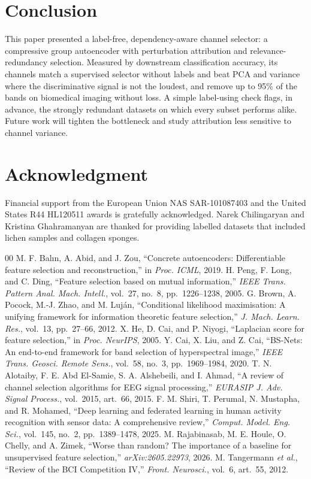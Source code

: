 \documentclass[conference]{IEEEtran}
\begin{document}
\section{Conclusion}
This paper presented a label-free, dependency-aware channel selector: a compressive
group autoencoder with perturbation attribution and relevance-redundancy selection.
Measured by downstream classification accuracy, its channels match a supervised
selector without labels and beat PCA and variance where the discriminative signal is
not the loudest, and remove up to 95\% of the bands on biomedical imaging without
loss. A simple label-using check flags, in advance, the strongly redundant datasets
on which every subset performs alike. Future work will tighten the bottleneck and
study attribution less sensitive to channel variance.

\section*{Acknowledgment}
Financial support from the European Union NAS SAR-101087403 and the United States
R44 HL120511 awards is gratefully acknowledged. Narek Chilingaryan and Kristina
Ghahramanyan are thanked for providing labelled datasets that included lichen
samples and collagen sponges.

\begin{thebibliography}{00}
 M. F. Bal\i{}n, A. Abid, and J. Zou, ``Concrete
autoencoders: Differentiable feature selection and reconstruction,'' in
\emph{Proc. ICML}, 2019.
 H. Peng, F. Long, and C. Ding, ``Feature selection based on
mutual information,'' \emph{IEEE Trans. Pattern Anal. Mach. Intell.}, vol.~27,
no.~8, pp.~1226--1238, 2005.
 G. Brown, A. Pocock, M.-J. Zhao, and M. Luj\'an, ``Conditional
likelihood maximisation: A unifying framework for information theoretic feature
selection,'' \emph{J. Mach. Learn. Res.}, vol.~13, pp.~27--66, 2012.
 X. He, D. Cai, and P. Niyogi, ``Laplacian score for
feature selection,'' in \emph{Proc. NeurIPS}, 2005.
 Y. Cai, X. Liu, and Z. Cai, ``BS-Nets: An end-to-end
framework for band selection of hyperspectral image,'' \emph{IEEE Trans. Geosci.
Remote Sens.}, vol.~58, no.~3, pp.~1969--1984, 2020.
 T. N. Alotaiby, F. E. Abd El-Samie, S. A. Alshebeili, and
I. Ahmad, ``A review of channel selection algorithms for EEG signal processing,''
\emph{EURASIP J. Adv. Signal Process.}, vol.~2015, art.~66, 2015.
 F. M. Shiri, T. Perumal, N. Mustapha, and R. Mohamed, ``Deep
learning and federated learning in human activity recognition with sensor data: A
comprehensive review,'' \emph{Comput. Model. Eng. Sci.}, vol.~145, no.~2,
pp.~1389--1478, 2025.
 M. Rajabinasab, M. E. Houle, O. Chelly, and A.
Zimek, ``Worse than random? The importance of a baseline for unsupervised feature
selection,'' \emph{arXiv:2605.22973}, 2026.
 M. Tangermann \emph{et al.}, ``Review of the BCI Competition
IV,'' \emph{Front. Neurosci.}, vol.~6, art.~55, 2012.
\end{thebibliography}
\end{document}
